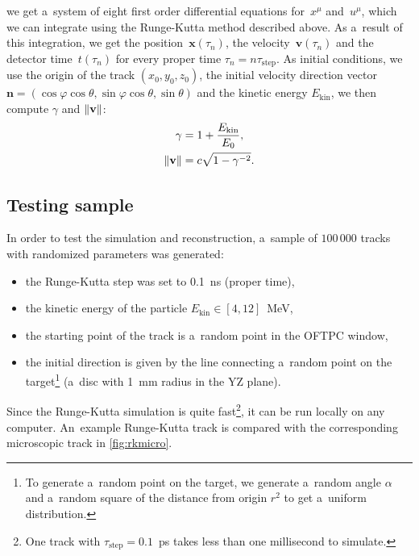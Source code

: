 		we get a~system of eight first order differential equations for~$x^\mu$ and~$u^\mu$, which we can integrate using the Runge-Kutta method described above. As a~result of this integration, we get the position~$\mathbf{x}(\tau_n)$, the velocity~$\mathbf{v}(\tau_n)$ and the detector time~$t(\tau_n)$ for every proper time $\tau_n = n \tau_\text{step}$. As initial conditions, we use the origin of the track $(x_0,y_0,z_0)$, the initial velocity direction vector $\mathbf{n} = (\cos\varphi\cos\theta,\sin\varphi\cos\theta,\sin\theta)$ and the kinetic energy $E_\text{kin}$, we then compute $\gamma$ and $\norm{\mathbf{v}}$:
			\begin{align}
				\gamma &= 1 + \frac{E_\text{kin}}{E_0},\\
				\norm{\mathbf{v}} &= c\sqrt{1-\gamma^{-2}}.
			\end{align}
			
		\subsection{Testing sample}
		\label{sec:rktest}
		
		In order to test the simulation and reconstruction, a~sample of $100\,000$ tracks with randomized parameters was generated:
			\begin{itemize}[topsep=4pt,itemsep=2pt]
				\item the Runge-Kutta step was set to 0.1~ns (proper time),
				\item the kinetic energy of the particle $E_\text{kin} \in [4,12]$~MeV,
				\item the starting point of the track is a~random point in the \ac{OFTPC} window,
				\item the initial direction is given by the line connecting a~random point on the target\footnote{To generate a~random point on the target, we generate a~random angle $\alpha$ and a~random square of the distance from origin $r^2$ to get a~uniform distribution.} (a~disc with 1~mm radius in the YZ plane).
			\end{itemize}
		Since the Runge-Kutta simulation is quite fast\footnote{One track with $\tau_\text{step} = 0.1$~ps takes less than one millisecond to simulate.}, it can be run locally on any computer. An~example Runge-Kutta track is compared with the corresponding microscopic track in \cref{fig:rkmicro}.
		
